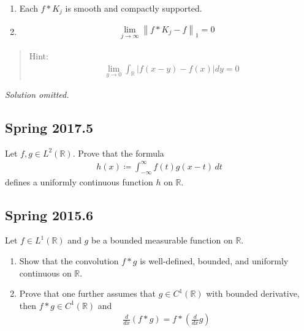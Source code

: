 \begin{enumerate}
\def\labelenumi{\arabic{enumi}.}
\item
  Each \(f\ast K_j\) is smooth and compactly supported.
\item

  \begin{align*}
  \lim _{j \to \infty} {\left\lVert {f * K_{j}-f} \right\rVert}_{1} = 0
  \end{align*}
\end{enumerate}

\begin{quote}
Hint:
\begin{align*}
\lim _{y \to 0} \int _{{\mathbb{R}}} |f(x-y)-f(x)| dy = 0
\end{align*}
\end{quote}


\emph{Solution omitted.}

\hypertarget{spring-2017.5}{%
\subsection{Spring 2017.5}\label{spring-2017.5}}

Let \(f, g \in L^2({\mathbb{R}})\). Prove that the formula
\begin{align*}
h(x) \coloneqq\int _{-\infty}^{\infty} f(t) g(x-t) \, dt
\end{align*}
defines a uniformly continuous function \(h\) on \({\mathbb{R}}\).

\hypertarget{spring-2015.6}{%
\subsection{Spring 2015.6}\label{spring-2015.6}}

Let \(f \in L^1({\mathbb{R}})\) and \(g\) be a bounded measurable
function on \({\mathbb{R}}\).

\begin{enumerate}
\def\labelenumi{\arabic{enumi}.}
\tightlist
\item
  Show that the convolution \(f\ast g\) is well-defined, bounded, and
  uniformly continuous on \({\mathbb{R}}\).
\item
  Prove that one further assumes that \(g \in C^1({\mathbb{R}})\) with
  bounded derivative, then \(f\ast g \in C^1({\mathbb{R}})\) and
  \begin{align*}
  \frac{d}{d x}(f * g)=f *\left(\frac{d}{d x} g\right)
  \end{align*}
\end{enumerate}

